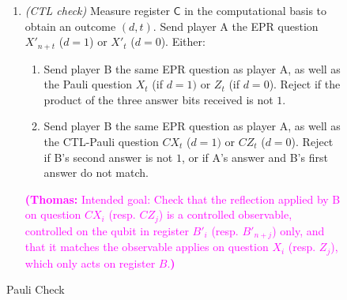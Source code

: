 \documentclass[11pt,letterpaper]{article}
\newcommand{\tnote}[1]{\textcolor{magenta}{\small {\textbf{(Thomas:} #1\textbf{)
      }}}}
\newcommand{\reg}[1]{{\textsf{#1}}}
\begin{document}
\begin{figure}[H]
\begin{center}
{\begin{minipage}{0.9\textwidth}
\begin{enumerate}
\item \emph{(CTL check)} Measure register $\reg{C}$ in the computational basis to obtain an outcome $(d,t)$. Send player A the EPR question $X'_{n+t}$ ($d=1$) or $X'_t$ ($d=0$). Either:
\begin{enumerate}
\item Send player B the same EPR question as player A, as well as the Pauli question $X_t$ (if $d=1)$ or $Z_t$ (if $d=0$).  Reject if the product of the three answer bits received is not $1$.
\item Send player B the same EPR question as player A, as well as the CTL-Pauli question $CX_t$ ($d=1)$ or $CZ_t$ ($d=0$).  Reject if B's second answer is not $1$, or if A's answer and B's first answer do not match.
\end{enumerate}
\tnote{Intended goal: Check that the reflection applied by B on question $CX_i$ (resp. $CZ_j$) is a controlled observable, controlled on the qubit in register $B'_i$ (resp. $B'_{n+j}$) only, and that it matches the observable applies on question $X_i$ (resp. $Z_j$), which only acts on register $B$.}
	\end{enumerate}    
\end{minipage}
}
\end{center}
\caption{Pauli Check}
\label{fig:pauli_check}
\end{figure}
\end{document}

